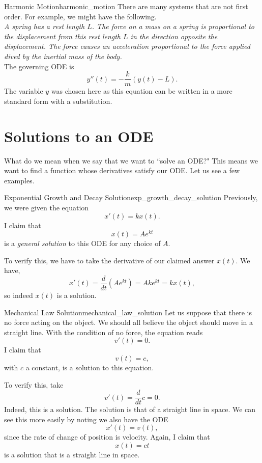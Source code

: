         \begin{ex}{Harmonic Motion}{harmonic_motion}
        There are many systems that are not first order.  For example, we might have the following.\\
        
        \emph{A spring has a rest length $L$. The force on a mass on a spring is proportional to the displacement from this rest length $L$ in the direction opposite the displacement. The force causes an acceleration proportional to the force applied dived by the inertial mass of the body.}\\
        
        The governing ODE is
        \[
        y''(t) = -\frac{k}{m}(y(t)-L).
        \]
        The variable $y$ was chosen here as this equation can be written in a more standard form with a substitution.
        \end{ex}
        
        \section{Solutions to an ODE}
        
        What do we mean when we say that we want to ``solve an ODE?" This means we want to find a function whose derivatives satisfy our ODE.  Let us see a few examples.
        
        \begin{ex}{Exponential Growth and Decay Solution}{exp_growth_decay_solution}
        Previously, we were given the equation
        \[
        x'(t)=kx(t).
        \]
        I claim that 
        \[
        x(t)=Ae^{kt}
        \]
        is a \emph{general solution} to this ODE for any choice of $A$. 
        
        To verify this, we have to take the derivative of our claimed answer $x(t)$. We have,
        \[
        x'(t)=\frac{d}{dt}\left(Ae^{kt}\right)=Ake^{kt}=kx(t),
        \]
        so indeed $x(t)$ is a solution.
        \end{ex}
        
        \begin{ex}{Mechanical Law Solution}{mechanical_law_solution}
        Let us suppose that there is no force acting on the object.  We should all believe the object should move in a straight line.  With the condition of no force, the equation reads
        \[
        v'(t)=0.
        \]
        I claim that 
        \[
        v(t)=c,
        \]
        with $c$ a constant, is a solution to this equation. 
        
        To verify this, take
        \[
        v'(t)=\frac{d}{dt} c = 0.
        \]
        Indeed, this is a solution.  The solution is that of a straight line in space.  We can see this more easily by noting we also have the ODE
        \[
        x'(t) = v(t),
        \]
        since the rate of change of position is velocity. Again, I claim that
        \[
        x(t) = ct
        \]
        is a solution that is a straight line in space. 
        \end{ex}
        
